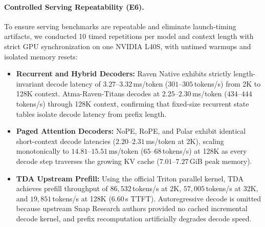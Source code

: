 \paragraph{Controlled Serving Repeatability (E6).}
To ensure serving benchmarks are repeatable and eliminate launch-timing artifacts, we conducted 10 timed repetitions per model and context length with strict GPU synchronization on one NVIDIA L40S, with untimed warmups and isolated memory resets:
\begin{itemize}
  \item \textbf{Recurrent and Hybrid Decoders:} Raven Native exhibits strictly length-invariant decode latency of $3.27$--$3.32$\,ms/token ($301$--$305$\,tokens/s) from 2K to 128K context. Atma-Raven-Titans decodes at $2.25$--$2.30$\,ms/token ($434$--$444$\,tokens/s) through 128K context, confirming that fixed-size recurrent state tables isolate decode latency from prefix length.
  \item \textbf{Paged Attention Decoders:} NoPE, RoPE, and Polar exhibit identical short-context decode latencies ($2.20$--$2.31$\,ms/token at 2K), scaling monotonically to $14.81$--$15.51$\,ms/token ($65$--$68$\,tokens/s) at 128K as every decode step traverses the growing KV cache ($7.01$--$7.27$\,GiB peak memory).
  \item \textbf{TDA Upstream Prefill:} Using the official Triton parallel kernel, TDA achieves prefill throughput of $86{,}532$\,tokens/s at 2K, $57{,}005$\,tokens/s at 32K, and $19{,}851$\,tokens/s at 128K ($6.60$\,s TTFT). Autoregressive decode is omitted because upstream Snap Research authors provided no cached incremental decode kernel, and prefix recomputation artificially degrades decode speed.
\end{itemize}

